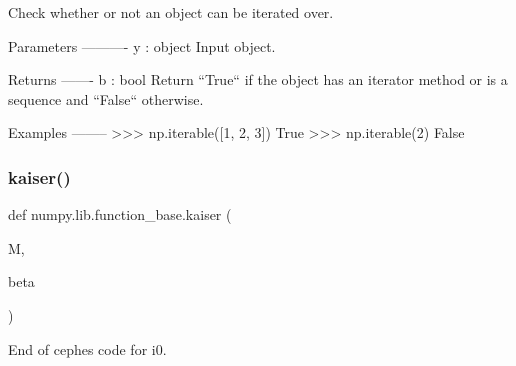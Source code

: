 \begin{DoxyVerb}Check whether or not an object can be iterated over.

Parameters
----------
y : object
  Input object.

Returns
-------
b : bool
  Return ``True`` if the object has an iterator method or is a
  sequence and ``False`` otherwise.


Examples
--------
>>> np.iterable([1, 2, 3])
True
>>> np.iterable(2)
False\end{DoxyVerb}
 \mbox{\label{namespacenumpy_1_1lib_1_1function__base_a0b737aa5318d54e6314310ff0358166b}} 
\subsubsection{\texorpdfstring{kaiser()}{kaiser()}}
{\footnotesize\ttfamily def numpy.\+lib.\+function\+\_\+base.\+kaiser (\begin{DoxyParamCaption}\item[{}]{M,  }\item[{}]{beta }\end{DoxyParamCaption})}



End of cephes code for i0. 

